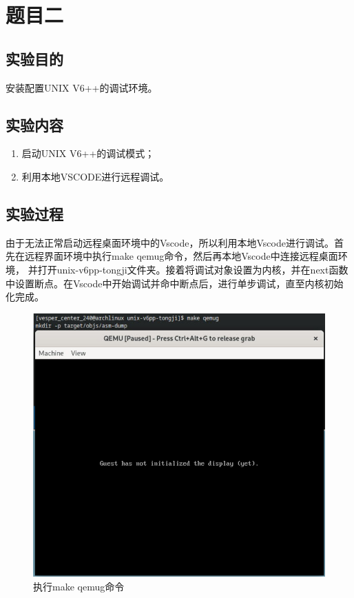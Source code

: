 \section{题目二}
\subsection{实验目的}
安装配置UNIX V6++的调试环境。
\subsection{实验内容}
\begin{enumerate}
    \item 启动UNIX V6++的调试模式；
    \item  利用本地VSCODE进行远程调试。
\end{enumerate}
\subsection{实验过程}
由于无法正常启动远程桌面环境中的Vscode，所以利用本地Vscode进行调试。首先在远程界面环境中执行make qemug命令，然后再本地Vscode中连接远程桌面环境，
并打开unix-v6pp-tongji文件夹。接着将调试对象设置为内核，并在next函数中设置断点。在Vscode中开始调试并命中断点后，进行单步调试，直至内核初始化完成。
\begin{figure}[!htbp]
    \centering
    \includegraphics[scale=0.5]{fig/qemug.png}
    \caption{执行make qemug命令}\label{qemug}
\end{figure}

